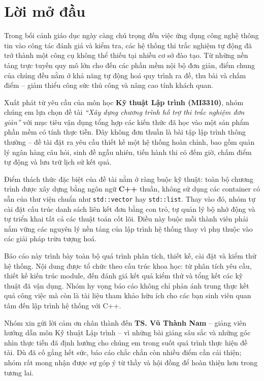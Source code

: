 \documentclass[11pt]{report}
\begin{document}
\newpage
\chapter*{Lời mở đầu}
\thispagestyle{empty}

Trong bối cảnh giáo dục ngày càng chú trọng đến việc ứng dụng công nghệ thông tin vào công tác đánh giá và kiểm tra, các hệ thống thi trắc nghiệm tự động đã trở thành một công cụ không thể thiếu tại nhiều cơ sở đào tạo. Từ những nền tảng trực tuyến quy mô lớn cho đến các phần mềm nội bộ đơn giản, điểm chung của chúng đều nằm ở khả năng tự động hoá quy trình ra đề, thu bài và chấm điểm -- giảm thiểu công sức thủ công và nâng cao tính khách quan.

Xuất phát từ yêu cầu của môn học \textbf{Kỹ thuật Lập trình (MI3310)}, nhóm chúng em lựa chọn đề tài \textit{``Xây dựng chương trình hỗ trợ thi trắc nghiệm đơn giản''} với mục tiêu vận dụng tổng hợp các kiến thức đã học vào một sản phẩm phần mềm có tính thực tiễn. Đây không đơn thuần là bài tập lập trình thông thường -- đề tài đặt ra yêu cầu thiết kế một hệ thống hoàn chỉnh, bao gồm quản lý ngân hàng câu hỏi, sinh đề ngẫu nhiên, tiến hành thi có đếm giờ, chấm điểm tự động và lưu trữ lịch sử kết quả.

Điểm thách thức đặc biệt của đề tài nằm ở ràng buộc kỹ thuật: toàn bộ chương trình được xây dựng bằng ngôn ngữ \textbf{C++} thuần, không sử dụng các container có sẵn của thư viện chuẩn như \texttt{std::vector} hay \texttt{std::list}. Thay vào đó, nhóm tự cài đặt cấu trúc danh sách liên kết đơn bằng con trỏ, tự quản lý bộ nhớ động và tự triển khai tất cả các thuật toán cốt lõi. Điều này buộc mỗi thành viên phải nắm vững các nguyên lý nền tảng của lập trình hệ thống thay vì phụ thuộc vào các giải pháp trừu tượng hoá.

Báo cáo này trình bày toàn bộ quá trình phân tích, thiết kế, cài đặt và kiểm thử hệ thống. Nội dung được tổ chức theo cấu trúc khoa học: từ phân tích yêu cầu, thiết kế kiến trúc module, đến đánh giá kết quả kiểm thử và tổng kết các kỹ thuật đã vận dụng. Nhóm hy vọng báo cáo không chỉ phản ánh trung thực kết quả công việc mà còn là tài liệu tham khảo hữu ích cho các bạn sinh viên quan tâm đến lập trình hệ thống với C++.

Nhóm xin gửi lời cảm ơn chân thành đến \textbf{TS. Vũ Thành Nam} -- giảng viên hướng dẫn môn Kỹ thuật Lập trình -- vì những bài giảng sâu sắc và những góc nhìn thực tiễn đã định hướng cho chúng em trong suốt quá trình thực hiện đề tài. Dù đã cố gắng hết sức, báo cáo chắc chắn còn nhiều điểm cần cải thiện; nhóm rất mong nhận được sự góp ý từ thầy và hội đồng để hoàn thiện hơn trong tương lai.
\end{document}
